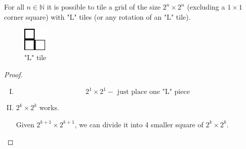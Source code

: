 \documentclass[00_complete]{subfiles}
\begin{document}
\begin{example}
    For all $n \in \mathbb{N}$ it is possible to tile a grid of the size $2^n
    \times 2^n$ (excluding a $1 \times 1$ corner square) with "L" tiles (or any
    rotation of an "L" tile).
\begin{figure}[ht]
  \centering
    \includegraphics[width=0.1\textwidth]{w8_l}
    \caption{"L" tile}
\end{figure}
\begin{proof}
    \begin{enumerate}[I.]
        \item
        \begin{equation}
            2^1 \times 2^1 - \text{ just place one "L" piece}
            \tag{\checkmark}
        \end{equation}
        \item
        $2^k \times 2^k$ works.

        Given $2^{k+1} \times 2^{k+1}$, we can divide it into 4 smaller square
        of $2^k \times 2^k$.
    \end{enumerate}
\end{proof}
\end{example}
\end{document}
